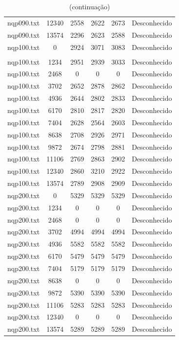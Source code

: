 \documentclass[12pt]{article}
\begin{document}
{\begin{longtable}{c|c|cccc}
		nqp090.txt    &   12340   &   2558   &   2622   &   2673   & Desconhecido \\
		nqp090.txt    &   13574   &   2296   &   2623   &   2588   & Desconhecido \\ \hline
		nqp100.txt    &   0       &   2924   &   3071   &   3083   & Desconhecido \\
		\caption[]{(continuação)}\\
		nqp100.txt    &   1234    &   2951   &   2939   &   3033   & Desconhecido \\
		nqp100.txt    &   2468    &   0      &   0      &   0      & Desconhecido \\
		nqp100.txt    &   3702    &   2652   &   2878   &   2862   & Desconhecido \\
		nqp100.txt    &   4936    &   2644   &   2802   &   2833   & Desconhecido \\
		nqp100.txt    &   6170    &   2810   &   2817   &   2820   & Desconhecido \\
		nqp100.txt    &   7404    &   2628   &   2564   &   2603   & Desconhecido \\
		nqp100.txt    &   8638    &   2708   &   2926   &   2971   & Desconhecido \\
		nqp100.txt    &   9872    &   2674   &   2798   &   2881   & Desconhecido \\
		nqp100.txt    &   11106   &   2769   &   2863   &   2902   & Desconhecido \\
		nqp100.txt    &   12340   &   2860   &   3210   &   2922   & Desconhecido \\
		nqp100.txt    &   13574   &   2789   &   2908   &   2909   & Desconhecido \\ \hline
		nqp200.txt    &   0       &   5329   &   5329   &   5329   & Desconhecido \\
		nqp200.txt    &   1234    &   0      &   0      &   0      & Desconhecido \\
		nqp200.txt    &   2468    &   0      &   0      &   0      & Desconhecido \\
		nqp200.txt    &   3702    &   4994   &   4994   &   4994   & Desconhecido \\
		nqp200.txt    &   4936    &   5582   &   5582   &   5582   & Desconhecido \\
		nqp200.txt    &   6170    &   5479   &   5479   &   5479   & Desconhecido \\
		nqp200.txt    &   7404    &   5179   &   5179   &   5179   & Desconhecido \\
		nqp200.txt    &   8638    &   0      &   0      &   0      & Desconhecido \\
		nqp200.txt    &   9872    &   5390   &   5390   &   5390   & Desconhecido \\
		nqp200.txt    &   11106   &   5283   &   5283   &   5283   & Desconhecido \\
		nqp200.txt    &   12340   &   0      &   0      &   0      & Desconhecido \\
		nqp200.txt    &   13574   &   5289   &   5289   &   5289   & Desconhecido \\ \hline

	\end{longtable}

}
\end{document}
